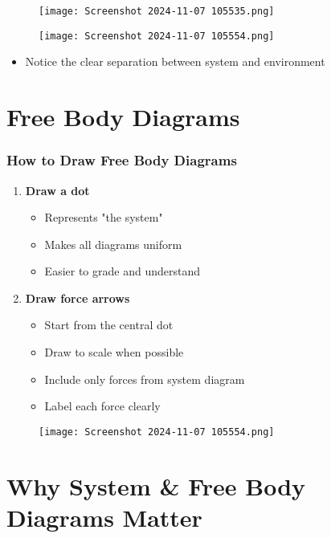 \documentclass{beamer}
\begin{document}
\begin{frame}
\begin{figure}[H]
    \centering
    \texttt{[image: Screenshot 2024-11-07 105535.png]}
\end{figure}
\pause
\begin{figure}[H]
    \centering
    \texttt{[image: Screenshot 2024-11-07 105554.png]}
\end{figure}
\pause
\begin{itemize}
    \item Notice the clear separation between system and environment
\end{itemize}
\end{frame}

\section{Free Body Diagrams}

\begin{frame}
\frametitle{How to Draw Free Body Diagrams}
\begin{enumerate}
    \item \textbf{Draw a dot}
    \pause
    \begin{itemize}
        \item Represents "the system"
        \item Makes all diagrams uniform
        \item Easier to grade and understand
    \end{itemize}
    \pause
    \item \textbf{Draw force arrows}
    \pause
    \begin{itemize}
        \item Start from the central dot
        \item Draw to scale when possible
        \item Include only forces from system diagram
        \item Label each force clearly
    \end{itemize}
\end{enumerate}
\pause
\begin{figure}
    \centering
    \texttt{[image: Screenshot 2024-11-07 105554.png]}
\end{figure}
\end{frame}

\section{Why System \& Free Body Diagrams Matter}
\end{document}
